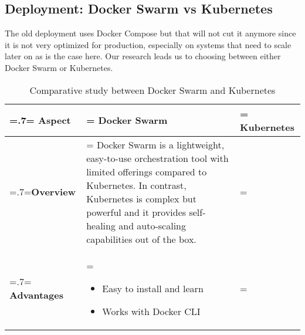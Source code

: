 \subsection{Deployment: Docker Swarm vs Kubernetes}
The old deployment uses Docker Compose but that will not cut it anymore since it is not very optimized for production, especially on systems that need to scale later on as is the case here.
Our research leads us to choosing between either Docker Swarm or Kubernetes.

\begin{table}[H]
    \renewcommand{\arraystretch}{1.5}%
    \caption{Comparative study between Docker Swarm and Kubernetes}
    \centering
    \medskip
    \begin{tabularx}{1\textwidth} {
            | >{\hsize=.7\hsize\linewidth=\hsize\centering\arraybackslash}X
            | >{\hsize=1.15\hsize\linewidth=\hsize\justifying\arraybackslash}X
            | >{\hsize=1.15\hsize\linewidth=\hsize\justifying\arraybackslash}X |}
        \hline
        \rowcolor{primary} \textbf {Aspect} & \textbf{Docker Swarm}                                                                                                                                                                                                                                                              & \textbf{Kubernetes}                                             \\
        \hline
        \textbf {Overview}                  & \multicolumn{2}{|>{\hsize=2.35\hsize}X|} {Docker Swarm is a lightweight, easy-to-use orchestration tool with limited offerings compared to Kubernetes. In contrast, Kubernetes is complex but powerful and it provides self-healing and auto-scaling capabilities out of the box.}                                                                   \\
        \hline
        \textbf {Advantages}                & \begin{itemize}[leftmargin=*, topsep=0pt, itemsep=1pt, parsep=2pt]
            \item Easy to install and learn
            \item Works with Docker CLI
        \end{itemize}                                                                                                                                                                                                                                                      & \begin{itemize}[leftmargin=*, topsep=0pt, itemsep=1pt, parsep=2pt]

\end{itemize}
\end{tabularx}
\end{table}
